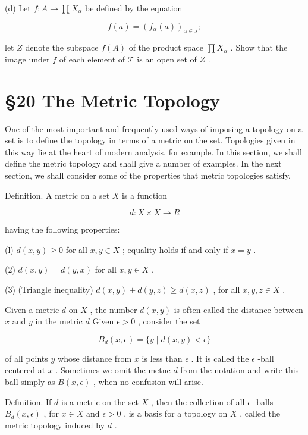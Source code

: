 \documentclass[10pt]{article}
\begin{document}
(d) Let \(f : A \rightarrow  \prod {X}_{\alpha }\) be defined by the equation

\[
f\left( a\right)  = {\left( {f}_{\alpha }\left( a\right) \right) }_{\alpha  \in  J};
\]

let \(Z\) denote the subspace \(f\left( A\right)\) of the product space \(\prod {X}_{\alpha }\) . Show that the image under \(f\) of each element of \(\mathcal{T}\) is an open set of \(Z\) .

\section*{§20 The Metric Topology}

One of the most important and frequently used ways of imposing a topology on a set is to define the topology in terms of a metric on the set. Topologies given in this way lie at the heart of modern analysis, for example. In this section, we shall define the metric topology and shall give a number of examples. In the next section, we shall consider some of the properties that metric topologies satisfy.

Definition. A metric on a set \(X\) is a function

\[
d : X \times  X \rightarrow  R
\]

having the following properties:

(l) \(d\left( {x,y}\right)  \geq  0\) for all \(x,y \in  X\) ; equality holds if and only if \(x = y\) .

(2) \(d\left( {x,y}\right)  = d\left( {y,x}\right)\) for all \(x,y \in  X\) .

(3) (Triangle inequality) \(d\left( {x,y}\right)  + d\left( {y,z}\right)  \geq  d\left( {x,z}\right)\) , for all \(x,y,z \in  X\) .

Given a metric \(d\) on \(X\) , the number \(d\left( {x,y}\right)\) is often called the distance between \(x\) and \(y\) in the metric \(d\) Given \(\epsilon  > 0\) , consider the set

\[
{B}_{d}\left( {x,\epsilon }\right)  = \{ y \mid  d\left( {x,y}\right)  < \epsilon \}
\]

of all points \(y\) whose distance from \(x\) is less than \(\epsilon\) . It is called the \(\epsilon\) -ball centered at \(x\) . Sometimes we omit the metnc \(d\) from the notation and write this ball simply as \(B\left( {x,\epsilon }\right)\) , when no confusion will arise.

Definition. If \(d\) is a metric on the set \(X\) , then the collection of all \(\epsilon\) -balls \({B}_{d}\left( {x,\epsilon }\right)\) , for \(x \in  X\) and \(\epsilon  > 0\) , is a basis for a topology on \(X\) , called the metric topology induced by \(d\) .
\end{document}
